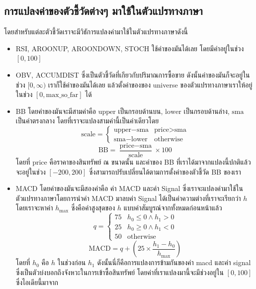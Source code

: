 \subsection{การแปลงค่าของตัวชี้วัดต่างๆ มาใช้ในตัวแปรทางภาษา}
โดยสำหรับแต่ละตัวชี้วัดเราจะมีวิธัการแปลงค่ามาใช้ในตัวแปรทางภาษาดังนี้
\begin{itemize}
    \item{RSI, AROONUP, AROONDOWN, STOCH ใช้ค่าของมันได้เลย โดยมีค่าอยู่ในช่วง $[0, 100]$}
    \item{OBV, ACCUMDIST ซึ่งเป็นตัวชี้วัดที่เกียวกับปริมาณการซื้อขาย ดังนั้นค่าของมันก็จะอยู่ในช่วง $[0, \infty)$ เราก็ใช้ค่าของมันได้เลย แล้วตั้งค่าของของ universe ของตัวแปรทางภาษาเราให้อยู่ในช่วง $ [0, \text{max\_so\_far}] $ ได้}
    \item{BB โดยค่าของมันจะมีสามค่าคือ $\text{upper}$ เป็นกรอบด้านบน, $\text{lower}$ เป็นกรอบด้านล่าง, $\text{sma}$ เป็นค่าตรงกลาง โดยที่เราจะแปลงสามค่านี้เป็นค่าเดียวโดย 
    $$
        \text{scale} = \begin{cases}
            \text{upper} - \text{sma} & \text{price} > \text{sma} \\
            \text{sma} - \text{lower} & \text{otherwise}
        \end{cases}
    $$
    $$\text{BB} = \frac{\text{price}-\text{sma}}{\text{scale}} \times 100$$
    โดยที่ $\text{price}$ คือราคาของสินทรัพย์ ณ ขนาดนั้น และค่าของ BB ที่เราได้มาจากแปลงนี้ปกติแล้วจะอยู่ในช่วง $[-200, 200]$ ซึ่งสามารถปรับเปลี่ยนได้ตามการตั้งค่าของตัวชี้วัด BB ของเรา  
    }
    \item{MACD โดยค่าของมันจะมีสองค่าคือ ค่า MACD และค่า Signal ซึ่งเราจะแปลงค่ามาใช้ในตัวแปรทางภาษาโดยการนำค่า MACD มาลบค่า Signal ได้เป็นค่าความต่างที่เราจะเรียกว่า $h$ โดยเราจะหาค่า $h_{\text{max}}$ ซึ่งคือค่าสูงสุดของ $h$ แบบค่าสัมบูรณ์จากทั้งหมดก่อนหน้าแล้ว
    $$
        q = \begin{cases}
            75 & h_0 \le 0 \wedge h_1 > 0 \\
            25 & h_0 \ge 0 \wedge h_1 < 0 \\
            50 & \text{otherwise}
        \end{cases}
    $$
    $$
        \text{MACD} = q + (25 \times \frac{h_1 - h_0}{h_{\text{max}}})
    $$
    โดยที่ $h_0$ คือ $h$ ในช่วงก่อน $h_1$ ดังนั้นนี่ก็คือการแปลงการข้ามกันของค่า macd และค่า signal ซึ่งเป็นตัวบ่งบอกถึงจังหวะในการเข้าซื้อสินทรัพย์ โดยค่าที่เราแปลงมานี้จะมีช่วงอยู่ใน $[0, 100]$ ซึ่งไอเดียนี้มาจาก \cite{Rodrigo}
    }
\end{itemize}

